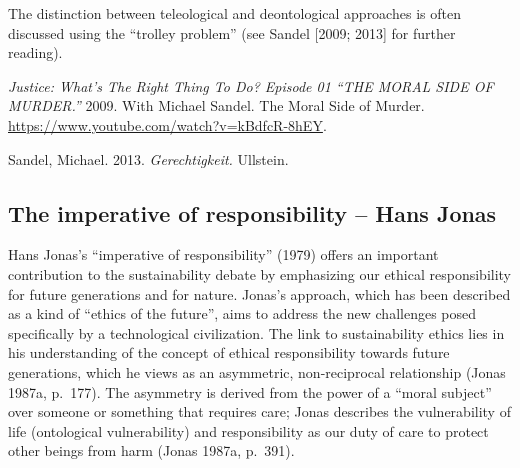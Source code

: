 \documentclass[
  a4paper,
  openany]{book}
\begin{document}
The distinction between teleological and deontological approaches is
often discussed using the ``trolley problem'' (see Sandel {[}2009;
2013{]} for further reading).

\begin{tcolorbox}[enhanced jigsaw, left=2mm, arc=.35mm, titlerule=0mm, opacityback=0, leftrule=.75mm, title={Further reading}, breakable, bottomtitle=1mm, rightrule=.15mm, coltitle=black, toptitle=1mm, bottomrule=.15mm, colback=white, opacitybacktitle=0.6, colbacktitle=quarto-callout-note-color!10!white, toprule=.15mm, colframe=quarto-callout-note-color-frame]

\emph{Justice: What's The Right Thing To Do? Episode 01 ``THE MORAL SIDE
OF MURDER.''} 2009. With Michael Sandel. The Moral Side of Murder.
\url{https://www.youtube.com/watch?v=kBdfcR-8hEY}.

Sandel, Michael. 2013. \emph{Gerechtigkeit.} Ullstein.

\end{tcolorbox}

\subsection{The imperative of responsibility -- Hans
Jonas}\label{the-imperative-of-responsibility-hans-jonas}

Hans Jonas's ``imperative of responsibility'' (1979) offers an important
contribution to the sustainability debate by emphasizing our ethical
responsibility for future generations and for nature. Jonas's approach,
which has been described as a kind of ``ethics of the future'', aims to
address the new challenges posed specifically by a technological
civilization. The link to sustainability ethics lies in his
understanding of the concept of ethical responsibility towards future
generations, which he views as an asymmetric, non-reciprocal
relationship (Jonas 1987a, p.~177). The asymmetry is derived from the
power of a ``moral subject'' over someone or something that requires
care; Jonas describes the vulnerability of life (ontological
vulnerability) and responsibility as our duty of care to protect other
beings from harm (Jonas 1987a, p.~391).
\end{document}
